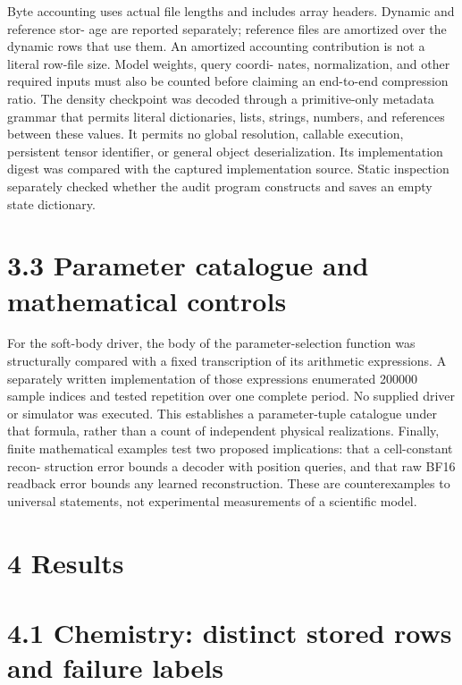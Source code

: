 \documentclass[11pt]{article}
\begin{document}
Byte accounting uses actual file lengths and includes array headers. Dynamic and reference stor-
age are reported separately; reference files are amortized over the dynamic rows that use them.
An amortized accounting contribution is not a literal row-file size. Model weights, query coordi-
nates, normalization, and other required inputs must also be counted before claiming an end-to-end
compression ratio.
The density checkpoint was decoded through a primitive-only metadata grammar that permits
literal dictionaries, lists, strings, numbers, and references between these values. It permits no global
resolution, callable execution, persistent tensor identifier, or general object deserialization. Its
implementation digest was compared with the captured implementation source. Static inspection
separately checked whether the audit program constructs and saves an empty state dictionary.

\section*{3.3 Parameter catalogue and mathematical controls}

For the soft-body driver, the body of the parameter-selection function was structurally compared
with a fixed transcription of its arithmetic expressions. A separately written implementation of
those expressions enumerated 200000 sample indices and tested repetition over one complete period.
No supplied driver or simulator was executed. This establishes a parameter-tuple catalogue under
that formula, rather than a count of independent physical realizations.
Finally, finite mathematical examples test two proposed implications: that a cell-constant recon-
struction error bounds a decoder with position queries, and that raw BF16 readback error bounds
any learned reconstruction. These are counterexamples to universal statements, not experimental
measurements of a scientific model.

\section*{4 Results}


\section*{4.1 Chemistry: distinct stored rows and failure labels}
\end{document}
